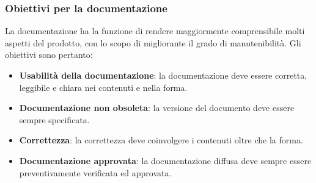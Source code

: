 \documentclass[12pt,a4paper]{article}
\begin{document}
\subsubsection{Obiettivi per la documentazione}
La documentazione ha la funzione di rendere maggiormente comprensibile molti aspetti del prodotto, con lo scopo di migliorante il grado di manutenibilità. 
Gli obiettivi sono pertanto:
\begin{itemize}
	\item\textbf{Usabilità della documentazione}: la documentazione deve essere corretta, leggibile e chiara nei contenuti e nella forma.
	\item\textbf{Documentazione non obsoleta}: la versione del documento deve essere sempre specificata.
	\item\textbf{Correttezza}: la correttezza deve coinvolgere i contenuti oltre che la forma.
	\item\textbf{Documentazione approvata}: la documentazione diffusa deve sempre essere preventivamente verificata ed approvata.
\end{itemize}
\end{document}
